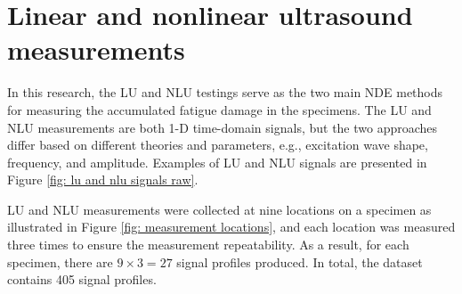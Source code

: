 \section{Linear and nonlinear ultrasound measurements}
In this research, the LU and NLU testings serve as the two main NDE methods for measuring the accumulated fatigue damage in the specimens. 
The LU and NLU measurements are both 1-D time-domain signals, but the two approaches differ based on different theories and parameters, e.g., excitation wave shape, frequency, and amplitude. Examples of LU and NLU signals are presented in Figure \ref{fig: lu and nlu signals raw}.

LU and NLU measurements were collected at nine locations on a specimen as illustrated in Figure \ref{fig: measurement locations}, and each location was measured three times to ensure the measurement repeatability. As a result, for each specimen, there are $9 \times 3 = 27$ signal profiles produced. In total, the dataset contains 405 signal profiles.


